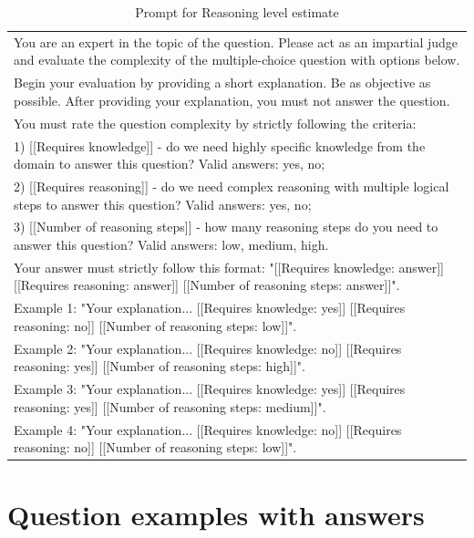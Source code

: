 \begin{table}[H]
    \centering
    \small
    \caption{Prompt for Reasoning level estimate}
    \label{tab:reasoning_level_prompt}
    \begin{tabular}{p{11cm}}
    \hline
    You are an expert in the topic of the question. Please act as an impartial judge and evaluate the complexity of the multiple-choice question with options below. \\
    Begin your evaluation by providing a short explanation. Be as objective as possible. After providing your explanation, you must not answer the question. \\
    You must rate the question complexity by strictly following the criteria: \\
    1) [[Requires knowledge]] - do we need highly specific knowledge from the domain to answer this question? Valid answers: yes, no; \\
    2) [[Requires reasoning]] - do we need complex reasoning with multiple logical steps to answer this question? Valid answers: yes, no; \\
    3) [[Number of reasoning steps]] - how many reasoning steps do you need to answer this question? Valid answers: low, medium, high. \\
    Your answer must strictly follow this format:  
    "[[Requires knowledge: answer]] [[Requires reasoning: answer]] [[Number of reasoning steps: answer]]". \\
    Example 1: "Your explanation... [[Requires knowledge: yes]] [[Requires reasoning: no]] [[Number of reasoning steps: low]]". \\
    Example 2: "Your explanation... [[Requires knowledge: no]] [[Requires reasoning: yes]] [[Number of reasoning steps: high]]". \\
    Example 3: "Your explanation... [[Requires knowledge: yes]] [[Requires reasoning: yes]] [[Number of reasoning steps: medium]]". \\
    Example 4: "Your explanation... [[Requires knowledge: no]] [[Requires reasoning: no]] [[Number of reasoning steps: low]]". \\
    \hline
    \end{tabular}
\end{table}

\section{Question examples with answers}
\label{sec:question_examples}

